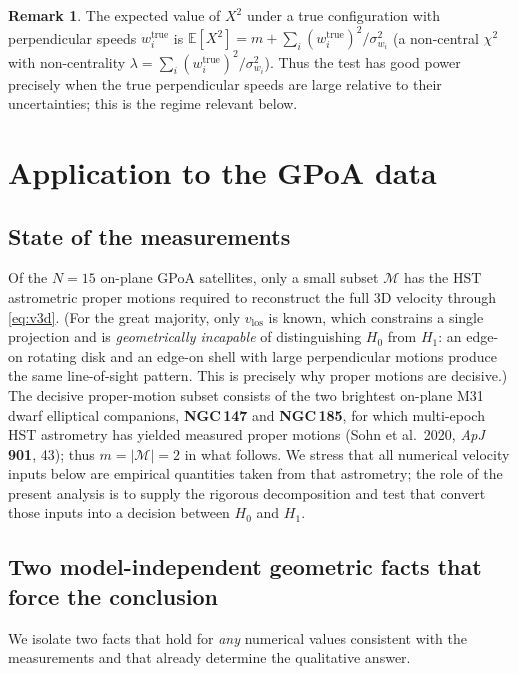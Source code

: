 \documentclass{amsart}
\theoremstyle{definition}
\newtheorem{remark}{Remark}
\begin{document}
\begin{remark}\label{rem:power}
The expected value of $X^2$ under a true configuration with perpendicular
speeds $w_i^{\mathrm{true}}$ is
$\mathbb E[X^2]=m+\sum_{i}(w_i^{\mathrm{true}})^2/\sigma_{w_i}^2$ (a
non-central $\chi^2$ with non-centrality
$\lambda=\sum_i (w_i^{\mathrm{true}})^2/\sigma_{w_i}^2$). Thus the test has
good power precisely when the true perpendicular speeds are large relative
to their uncertainties; this is the regime relevant below.
\end{remark}

\section{Application to the GPoA data}

\subsection{State of the measurements}
Of the $N=15$ on-plane GPoA satellites, only a small subset $\mathcal M$ has
the HST astrometric proper motions required to reconstruct the full 3D
velocity through \eqref{eq:v3d}. (For the great majority, only
$v_{\mathrm{los}}$ is known, which constrains a single projection and is
\emph{geometrically incapable} of distinguishing $H_0$ from $H_1$: an
edge-on rotating disk and an edge-on shell with large perpendicular motions
produce the same line-of-sight pattern. This is precisely why proper
motions are decisive.) The decisive proper-motion subset consists of the two
brightest on-plane M31 dwarf elliptical companions, \textbf{NGC\,147} and
\textbf{NGC\,185}, for which multi-epoch HST astrometry has yielded measured
proper motions (Sohn et al.\ 2020, \emph{ApJ} \textbf{901}, 43); thus
$m=|\mathcal M|=2$ in what follows. We stress that all numerical velocity
inputs below are empirical quantities taken from that astrometry; the role
of the present analysis is to supply the rigorous decomposition and test
that convert those inputs into a decision between $H_0$ and $H_1$.

\subsection{Two model-independent geometric facts that force the conclusion}
We isolate two facts that hold for \emph{any} numerical values consistent
with the measurements and that already determine the qualitative answer.
\end{document}

